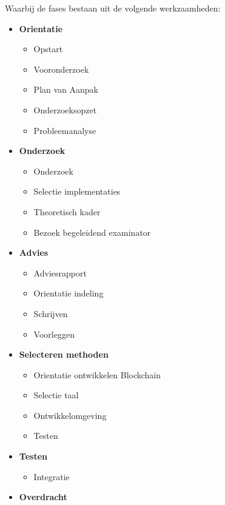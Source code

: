 Waarbij de fases bestaan uit de volgende werkzaamheden:

\begin{multicols}{2}
  \begin{itemize}[noitemsep]
    \item \textbf{Orientatie}
    \begin{itemize}[noitemsep]
      \item Opstart
      \item Vooronderzoek
      \item Plan van Aanpak
      \item Onderzoeksopzet
      \item Probleemanalyse
    \end{itemize}
    \item \textbf{Onderzoek}
    \begin{itemize}[noitemsep]
      \item Onderzoek
      \item Selectie implementaties
      \item Theoretisch kader
      \item Bezoek begeleidend examinator
    \end{itemize}
    \item \textbf{Advies}
    \begin{itemize}[noitemsep]
      \item Adviesrapport
      \item Orientatie indeling
      \item Schrijven
      \item Voorleggen
    \end{itemize}
    \item \textbf{Selecteren methoden}
    \begin{itemize}
      \item Orientatie ontwikkelen Blockchain
      \item Selectie taal
      \item Ontwikkelomgeving
      \item Testen
    \end{itemize}
    \item \textbf{Testen}
    \begin{itemize}[noitemsep]
      \item Integratie
    \end{itemize}
    \item \textbf{Overdracht}
  \end{itemize}
\end{multicols}

